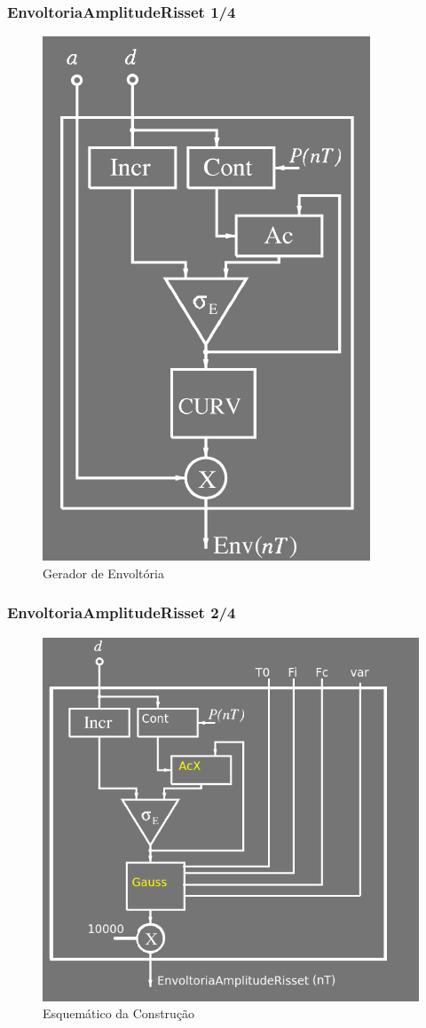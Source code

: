 \documentclass{beamer}
\begin{document}
\begin{frame}
 \frametitle{EnvoltoriaAmplitudeRisset 1/4}
 \begin{figure}
  \includegraphics[scale=0.4]{./images/gerador_envoltoria.png}
  \caption{Gerador de Envoltória}
   \end{figure}
\end{frame}

\begin{frame}
 \frametitle{EnvoltoriaAmplitudeRisset 2/4}
 \begin{figure}
  \includegraphics[scale=0.4]{./images/ampRisset_esquema.png}
  \caption{Esquemático da Construção}
   \end{figure}
\end{frame}
\end{document}
